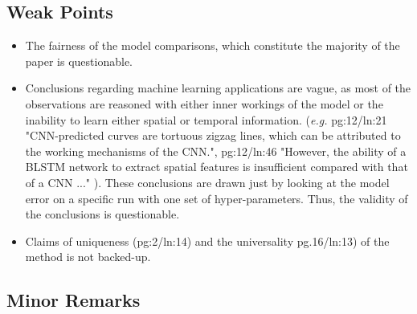 \documentclass[a4paper,9pt]{article}
\begin{document}
\subsection{Weak Points}
\begin{itemize}
    \item The fairness of the model comparisons, which constitute the majority of the paper is questionable.
    \item Conclusions regarding machine learning applications are vague, as most of the observations are reasoned with either inner workings of the model or the inability to learn either spatial or temporal information. (\textit{e.g.} pg:12/ln:21 "CNN-predicted curves are tortuous zigzag lines, which can be attributed to the working mechanisms of the CNN.", pg:12/ln:46 "However, the ability of a BLSTM network to extract spatial features is insufficient compared with that of a CNN ..." ). These conclusions are drawn just by looking at the model error on a specific run with one set of hyper-parameters. Thus, the validity of the conclusions is questionable.
    \item Claims of uniqueness (pg:2/ln:14) and the universality pg.16/ln:13) of the method is not backed-up.
\end{itemize}

\subsection{Minor Remarks}
\end{document}
